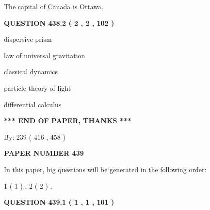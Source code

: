 \documentclass[12pt]{article}
\begin{document}
 
The capital of Canada is Ottawa.
 
 
 
 
  
\vspace{0.2in}
  
{\textbf{\Large{QUESTION
438.2 
 ( 2 , 2 , 102 )
}}}
  
  
 
 
\noindent{}
 
 
dispersive prism
 
 
law of universal gravitation
 
 
classical dynamics
 
 
particle theory of light
 
 
differential calculus
 
 
 
 
   
   
\vspace{1.0in} 
{\textbf{\large{ *** END OF PAPER, THANKS *** }}} 
   
   
\hspace{1.0in} By: 
 239 ( 416 ,  458 )
   
   
   
   
\newpage 
\setcounter{page}{ 
   439001 } 
   
   
   
   
 {\textbf{ \Large{ PAPER NUMBER  439  }}}
   
   
\vspace{0.2in}
   
   
   
   
   
\vspace{0.2in}
   
In this paper, big questions will be generated in the following order: 
   
   
   1 ( 1 )
 ,
   2 ( 2 )
 .
  
\vspace{0.2in}
  
{\textbf{\Large{QUESTION
439.1 
 ( 1 , 1 , 101 )
}}}
  
  
 
\end{document}

